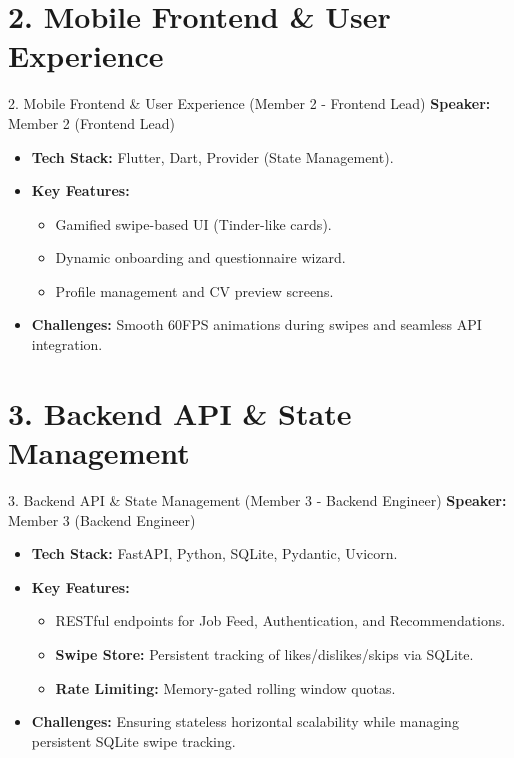 \documentclass[aspectratio=169]{beamer}
\begin{document}
\section{2. Mobile Frontend \& User Experience}
\begin{frame}{2. Mobile Frontend \& User Experience (Member 2 - Frontend Lead)}
    \textbf{Speaker:} Member 2 (Frontend Lead)
    \vspace{0.5cm}
    \begin{itemize}
        \item \textbf{Tech Stack:} Flutter, Dart, Provider (State Management).
        \item \textbf{Key Features:}
        \begin{itemize}
            \item Gamified swipe-based UI (Tinder-like cards).
            \item Dynamic onboarding and questionnaire wizard.
            \item Profile management and CV preview screens.
        \end{itemize}
        \item \textbf{Challenges:} Smooth 60FPS animations during swipes and seamless API integration.
    \end{itemize}
\end{frame}

\section{3. Backend API \& State Management}
\begin{frame}{3. Backend API \& State Management (Member 3 - Backend Engineer)}
    \textbf{Speaker:} Member 3 (Backend Engineer)
    \vspace{0.5cm}
    \begin{itemize}
        \item \textbf{Tech Stack:} FastAPI, Python, SQLite, Pydantic, Uvicorn.
        \item \textbf{Key Features:}
        \begin{itemize}
            \item RESTful endpoints for Job Feed, Authentication, and Recommendations.
            \item \textbf{Swipe Store:} Persistent tracking of likes/dislikes/skips via SQLite.
            \item \textbf{Rate Limiting:} Memory-gated rolling window quotas.
        \end{itemize}
        \item \textbf{Challenges:} Ensuring stateless horizontal scalability while managing persistent SQLite swipe tracking.
    \end{itemize}
\end{frame}
\end{document}
